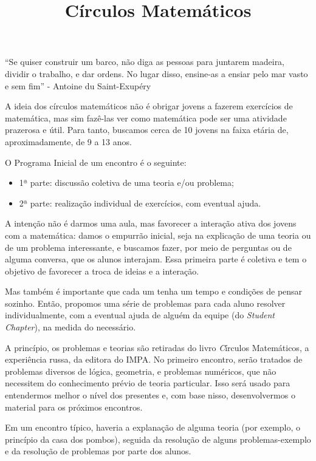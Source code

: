 \documentclass{article}
\title{Círculos Matemáticos}
\begin{document}
\maketitle

``Se quiser construir um barco, não diga as pessoas para juntarem madeira, dividir o trabalho, e dar ordens. No lugar disso, ensine-as a ensiar pelo mar vasto e sem fim'' - Antoine du Saint-Exupéry

A ideia dos círculos matemáticos não é obrigar jovens a fazerem exercícios de matemática, mas sim
fazê-las ver como matemática pode ser uma atividade prazerosa e útil. Para tanto, buscamos cerca de
10 jovens na faixa etária de, aproximadamente, de 9 a 13 anos.

O Programa Inicial de um encontro é o seguinte:

  \begin{itemize}
      \item1ª parte: discussão coletiva de uma teoria e/ou problema;
      \item2ª parte: realização individual de exercícios, com eventual ajuda.
  \end{itemize}

A intenção não é darmos uma aula, mas favorecer a interação ativa dos jovens com a matemática: damos o empurrão inicial, seja na explicação de uma teoria ou de um problema interessante, e buscamos fazer, por meio de perguntas ou de alguma conversa, que os alunos interajam. Essa primeira parte é coletiva e tem o objetivo de favorecer a troca de ideias e a interação.

Mas também é importante que cada um tenha um tempo e condições de pensar sozinho. Então, propomos uma série de problemas para cada aluno resolver individualmente, com a eventual ajuda de alguém da equipe (do \textit{Student Chapter}), na medida do necessário.

A princípio, os problemas e teorias são retiradas do livro {\textit Círculos Matemáticos, a experiência russa}, da editora do IMPA. No primeiro encontro, serão tratados de problemas diversos de lógica, geometria, e problemas numéricos, que não necessitem do conhecimento prévio de teoria particular. Isso será usado para entendermos melhor o nível dos presentes e, com base nisso, desenvolvermos o material para os próximos encontros.

Em um encontro típico, haveria a explanação de alguma teoria (por exemplo, o princípio da casa dos pombos), seguida da resolução de alguns problemas-exemplo e da resolução de problemas por parte dos alunos.
\end{document}
